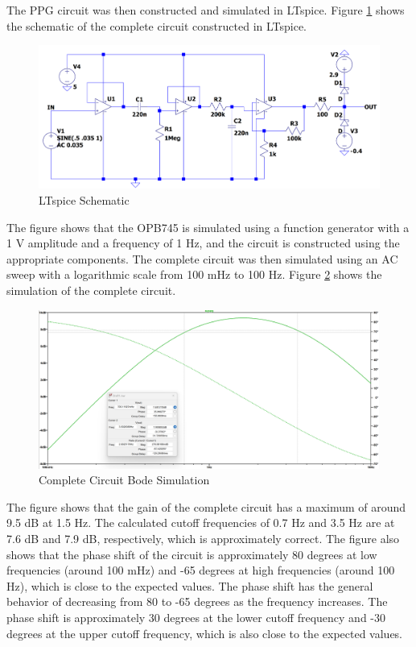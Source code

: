 \documentclass[CMPE]{KGCOEReport}
\begin{document}
\bigskip

The PPG circuit was then constructed and simulated in LTspice. Figure \ref{fig:ltspiceSchematic} shows the schematic of the complete circuit constructed in LTspice.

\begin{figure}[H]
    \centering
    \includegraphics[width=1\textwidth]{LTspiceSchematic.png}
    \caption{LTspice Schematic}
    \label{fig:ltspiceSchematic}
\end{figure}

The figure shows that the OPB745 is simulated using a function generator with a 1 V amplitude and a frequency of 1 Hz, and the circuit is constructed using the appropriate components. The complete circuit was then simulated using an AC sweep with a logarithmic scale from 100 mHz to 100 Hz. Figure \ref{fig:completeSim} shows the simulation of the complete circuit.

\begin{figure}[H]
    \centering
    \includegraphics[width=1\textwidth]{SimFreqOutputValues.png}
    \caption{Complete Circuit Bode Simulation}
    \label{fig:completeSim}
\end{figure}

The figure shows that the gain of the complete circuit has a maximum of around 9.5 dB at 1.5 Hz. The calculated cutoff frequencies of 0.7 Hz and 3.5 Hz are at 7.6 dB and 7.9 dB, respectively, which is approximately correct. The figure also shows that the phase shift of the circuit is approximately 80 degrees at low frequencies (around 100 mHz) and -65 degrees at high frequencies (around 100 Hz), which is close to the expected values. The phase shift has the general behavior of decreasing from 80 to -65 degrees as the frequency increases. The phase shift is approximately 30 degrees at the lower cutoff frequency and -30 degrees at the upper cutoff frequency, which is also close to the expected values.
\end{document}
